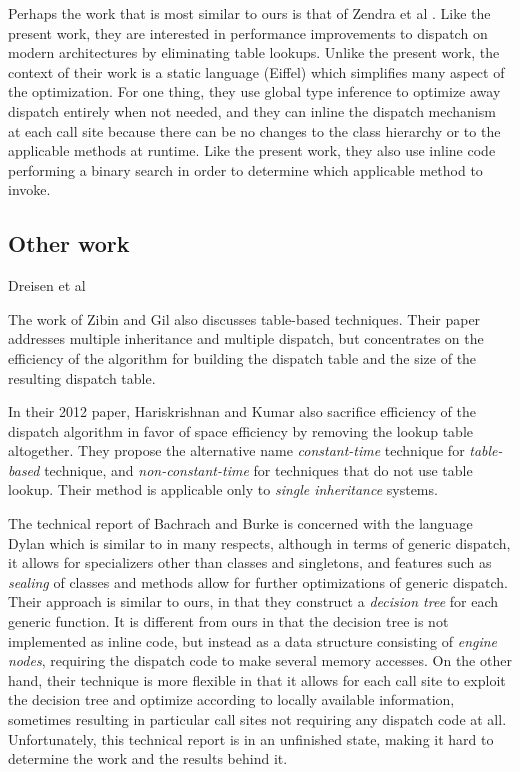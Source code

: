 Perhaps the work that is most similar to ours is that of Zendra et al
\cite{Zendra:1997:EDD:263698.263728}.  Like the present work, they are
interested in performance improvements to dispatch on modern
architectures by eliminating table lookups.  Unlike the present work,
the context of their work is a static language (Eiffel) which
simplifies many aspect of the optimization.  For one thing, they use
global type inference to optimize away dispatch entirely when not
needed, and they can inline the dispatch mechanism at each call site
because there can be no changes to the class hierarchy or to the
applicable methods at runtime.  Like the present work, they also use
inline code performing a binary search in order to determine which
applicable method to invoke.

\subsection{Other work}

Dreisen et al \cite{Driesen:1995:MDP:646153.679537}

The work of Zibin and Gil \cite{Zibin:2002:FAC:582419.582434} also
discusses table-based techniques.  Their paper addresses multiple
inheritance and multiple dispatch, but concentrates on the efficiency
of the algorithm for building the dispatch table and the size of the
resulting dispatch table. 

In their 2012 paper, Hariskrishnan and Kumar
\cite{Harikrishnan:2012:SEN:2108144.2108153} also sacrifice efficiency
of the dispatch algorithm in favor of space efficiency by removing the
lookup table altogether.  They propose the alternative name
\emph{constant-time} technique for \emph{table-based} technique, and
\emph{non-constant-time} for techniques that do not use table lookup.
Their method is applicable only to \emph{single inheritance} systems. 

The technical report of Bachrach and Burke \cite{Bachrach:2000} is
concerned with the language Dylan which is similar to \cl{} in many
respects, although in terms of generic dispatch, it allows for
specializers other than classes and singletons, and features such as
\emph{sealing} of classes and methods allow for further optimizations
of generic dispatch.  Their approach is similar to ours, in that they
construct a \emph{decision tree} for each generic function.  It is
different from ours in that the decision tree is not implemented as
inline code, but instead as a data structure consisting of
\emph{engine nodes}, requiring the dispatch code to make several
memory accesses.  On the other hand, their technique is more flexible
in that it allows for each call site to exploit the decision tree and
optimize according to locally available information, sometimes
resulting in particular call sites not requiring any dispatch code at
all.  Unfortunately, this technical report is in an unfinished state,
making it hard to determine the work and the results behind it.

